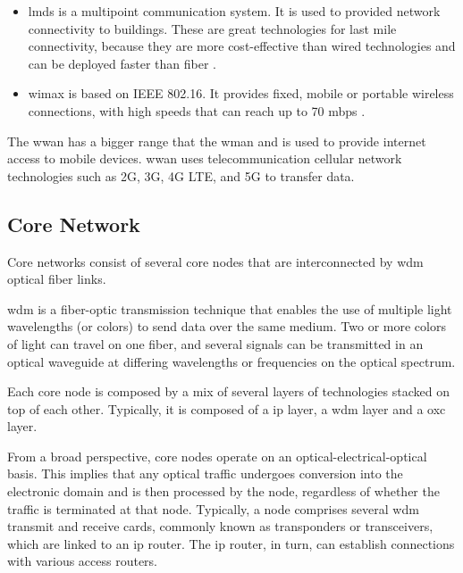 \begin{itemize}

    \item \ac{lmds} is a multipoint communication system. It is used to provided network connectivity to buildings. These are great technologies for last mile connectivity, because they are more cost-effective than wired technologies and can be deployed faster than fiber \cite{forum:imda}.

    \item \ac{wimax}  is based on IEEE 802.16. It provides fixed, mobile or portable wireless connections, with high speeds that can reach up to 70 \ac{mbps} \cite{forum:ctrfantennasinc}.

\end{itemize}

The \ac{wwan} has a bigger range that the \ac{wman} and is used to provide internet access to mobile devices.
\ac{wwan} uses telecommunication cellular network technologies such as 2G, 3G, 4G LTE, and 5G to transfer data.


\subsection{Core Network}

Core networks consist of several core nodes that are interconnected by \ac{wdm} optical fiber links.

\ac{wdm} is a fiber-optic transmission technique that enables the use of multiple light wavelengths (or colors) to send data over the same medium. Two or more colors of light can travel on one fiber, and several signals can be transmitted in an optical waveguide at differing wavelengths or frequencies on the optical spectrum. 

Each core node is composed by a mix of several layers of technologies stacked on top of each other. Typically, it is composed of a \ac{ip} layer, a \ac{wdm} layer and a \ac{oxc} layer.

From a broad perspective, core nodes operate on an optical-electrical-optical basis. This implies that any optical traffic undergoes conversion into the electronic domain and is then processed by the node, regardless of whether the traffic is terminated at that node. Typically, a node comprises several \ac{wdm} transmit and receive cards, commonly known as transponders or transceivers, which are linked to an \ac{ip} router. The \ac{ip} router, in turn, can establish connections with various access routers.

